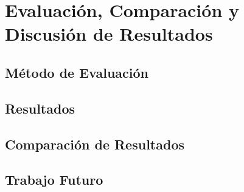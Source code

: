 \chapter{Evaluación, Comparación y Discusión de Resultados}
\label{ch:eval}

\section{Método de Evaluación}
\label{sec:eval}

\section{Resultados}
\label{sec:results}

\section{Comparación de Resultados}
\label{sec:compresult}

\section{Trabajo Futuro}
\label{sec:future}

